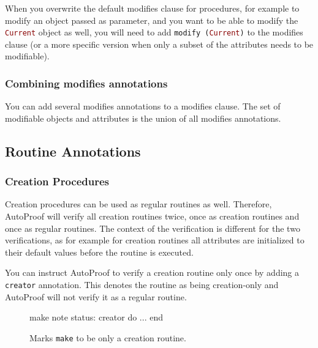 \documentclass[a4paper,12pt]{article}
\newcommand{\AutoProof}{Auto\-Proof\xspace}
\newcommand{\e}[1]{\mbox{\lstinline[language=Eiffel]|#1|}}
\begin{document}
When you overwrite the default modifies clause for procedures, for example to modify an object passed as parameter, and you want to be able to modify the \e{Current} object as well, you will need to add \e{modify (Current)} to the modifies clause (or a more specific version when only a subset of the attributes needs to be modifiable).

\subsubsection*{Combining modifies annotations}

You can add several modifies annotations to a modifies clause. The set of modifiable objects and attributes is the union of all modifies annotations.

\subsection{Routine Annotations}

\subsubsection*{Creation Procedures} \label{sec:creator}

Creation procedures can be used as regular routines as well. Therefore, \AutoProof will verify all creation routines twice, once as creation routines and once as regular routines. The context of the verification is different for the two verifications, as for example for creation routines all attributes are initialized to their default values before the routine is executed.

You can instruct \AutoProof to verify a creation routine only once by adding a \e{creator} annotation. This denotes the routine as being creation-only and \AutoProof will not verify it as a regular routine.

\begin{figure}
\begin{erunning}
make
	note
		status: creator
	do ... end
\end{erunning}
\hspace{0.5cm}
\caption*{Marks \e{make} to be only a creation routine.}
\end{figure}
\end{document}
